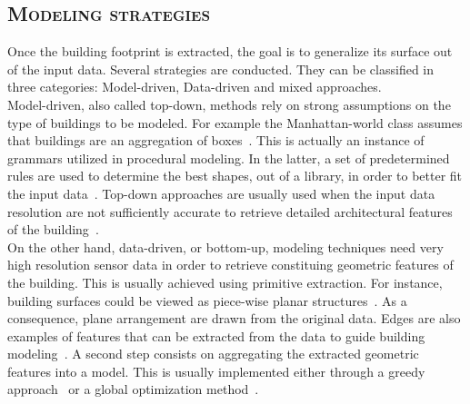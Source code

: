     \subsection{\textsc{Modeling strategies}}
        \label{subsec::state_of_the_art::building_modeling::modeling_strategies}
        Once the building footprint is extracted, the goal is to generalize its surface out of the input data.
        Several strategies are conducted.
        They can be classified in three categories: Model-driven, Data-driven and mixed approaches.\\

        Model-driven, also called top-down, methods rely on strong assumptions on the type of buildings to be modeled.
        For example the Manhattan-world class assumes that buildings are an aggregation of boxes~\parencite{li2016manhattan,vanegas2010building,ledoux2011topologically,arroyo2015dimension}.
        This is actually an instance of grammars utilized in procedural modeling.
        In the latter, a set of predetermined rules are used to determine the best shapes, out of a library, in order to better fit the input data~\parencite{lafarge2008structural,demir2015procedural,martinovic2013bayesian,mathias2011procedural,zeng2018neural,koutsourakis2009single,nan2015template,zhou20102}.
        Top-down approaches are usually used when the input data resolution are not sufficiently accurate to retrieve detailed architectural features of the building~\parencite{lafarge2008structural}.\\

        On the other hand, data-driven, or bottom-up, modeling techniques need very high resolution sensor data in order to retrieve constituing geometric features of the building.
        This is usually achieved using primitive extraction.
        For instance, building surfaces could be viewed as piece-wise planar structures~\parencite{nan2017polyfit,taillandier2004automatic,lafarge2012creating}.
        As a consequence, plane arrangement are drawn from the original data.
        Edges are also examples of features that can be extracted from the data to guide building modeling~\parencite{baillard1999automatic,}.
        A second step consists on aggregating the extracted geometric features into a model.
        This is usually implemented either through a greedy approach~\parencite{taillandier2004automatic} or a global optimization method~\parencite{zhu2018large,holzmann2018semantically,poullis2013framework,verdie2015lod}.\\

